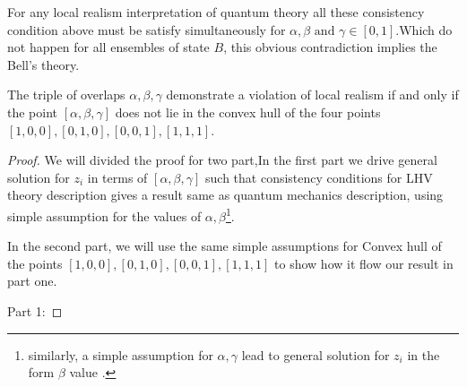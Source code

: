 For any local realism interpretation of quantum theory all these consistency condition above must be satisfy simultaneously for $\alpha, \beta \text{ and } \gamma \in [0,1]$.Which do not happen for all ensembles of state $B$, this obvious contradiction implies the Bell's theory.

\begin{theorem}
The triple of overlaps $\alpha,\beta, \gamma$ demonstrate a violation of local realism if and only if the point $[\alpha,\beta, \gamma]$ does not lie in the convex hull of the four points
$[1, 0, 0], [0, 1, 0], [0, 0, 1], [1, 1, 1]$.
\end{theorem}

\begin{proof}\hfill \break
We will divided the proof for two part,In the first part we drive general solution for $z_i$ in terms of $[\alpha, \beta, \gamma]$ such that consistency conditions for LHV theory description gives a result same as quantum mechanics description, using simple assumption for the values of $\alpha,\beta $\footnote{similarly, a simple assumption for $\alpha,\gamma $ lead to general solution for $z_i$ in the form  $\beta$ value .}.


In the second part, we will use the same simple assumptions for Convex hull of the points $[1, 0, 0], [0, 1, 0], [0, 0, 1], [1, 1, 1]$  to show how it flow our result in part one.

Part 1:


\end{proof}
